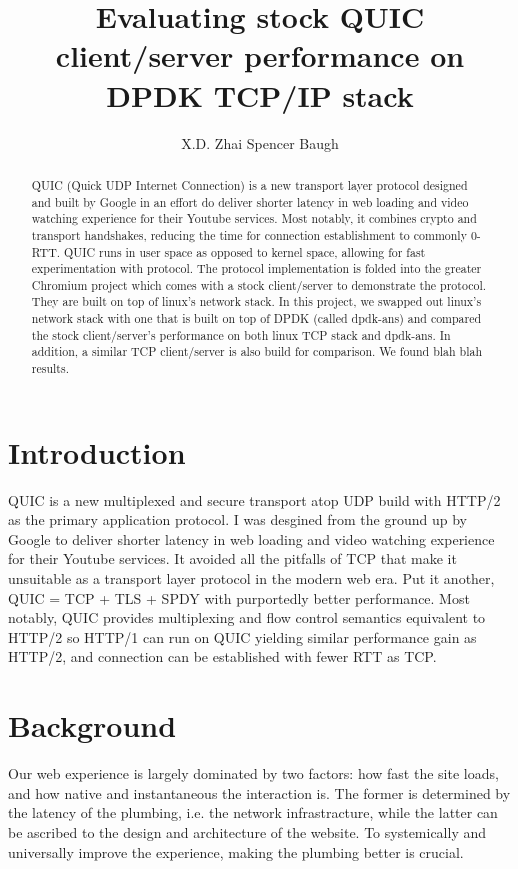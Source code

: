\documentclass{sig-alternate-05-2015}
\begin{document}
\title{Evaluating stock QUIC client/server performance on DPDK TCP/IP stack}

\author{
\alignauthor X.D. Zhai
\alignauthor Spencer Baugh 
}

\maketitle
\begin{abstract}
QUIC (Quick UDP Internet Connection) is a new transport layer protocol designed and built by Google in an effort do deliver shorter latency in web loading and video watching experience for their Youtube services. Most notably, it combines crypto and transport handshakes, reducing the time for connection establishment to commonly 0-RTT. QUIC runs in user space as opposed to kernel space, allowing for fast experimentation with protocol. The protocol implementation is folded into the greater Chromium project which comes with a stock client/server to demonstrate the protocol. They are built on top of linux's network stack. In this project, we swapped out linux's network stack with one that is built on top of DPDK (called dpdk-ans) and compared the stock client/server's performance on both linux TCP stack and dpdk-ans. In addition, a similar TCP client/server is also build for comparison. We found blah blah results.
\end{abstract}

\section{Introduction}
QUIC is a new multiplexed and secure transport atop UDP build with HTTP/2 as the primary application protocol. I was desgined from the ground up by Google to deliver shorter latency in web loading and video watching experience for their Youtube services. It avoided all the pitfalls of TCP that make it unsuitable as a transport layer protocol in the modern web era. Put it another, QUIC = TCP + TLS + SPDY with purportedly better performance. Most notably, QUIC provides multiplexing and flow control semantics equivalent to HTTP/2 so HTTP/1 can run on QUIC yielding similar performance gain as HTTP/2, and connection can be established with fewer RTT as TCP.

\section{Background}
Our web experience is largely dominated by two factors: how fast the site loads, and how native and instantaneous the interaction is. The former is determined by the latency of the plumbing, i.e. the network infrastracture, while the latter can be ascribed to the design and architecture of the website. To systemically and universally improve the experience, making the plumbing better is crucial. 
\end{document}
